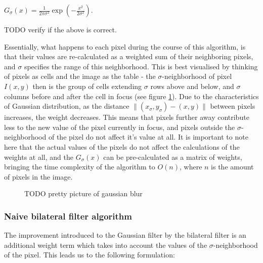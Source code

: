 \documentclass [12pt,a4paper]{report}
\begin{document}
\begin{center}
$G_\sigma(x) = \frac{1}{2\pi\sigma^2} \exp(-\frac{x^2}{2\sigma^2})$.
\end{center}

TODO verify if the above is correct.

Essentially, what happens to each pixel during the course of this algorithm, is that their values are re-calculated as a weighted sum of their neighboring pixels, and $\sigma$ specifies the range of this neighborhood. This is best visualised by thinking of pixels as cells and the image as the table - the $\sigma$-neighborhood of pixel $I(x,y)$ then is the group of cells extending $\sigma$ rows above and below, and $\sigma$ columns before and after the cell in focus (see figure \ref{fig_gaussian_blur}). Due to the characteristics of Gaussian distribution, as the distance $\| (x_\sigma, y_\sigma)-(x, y) \|$ between pixels increases, the weight decreases. This means that pixels further away contribute less to the new value of the pixel currently in focus, and pixels outside the $\sigma$-neighborhood of the pixel do not affect it's value at all. It is important to note here that the actual values of the pixels do not affect the calculations of the weights at all, and the $G_\sigma(x)$ can be pre-calculated as a matrix of weights, bringing the time complexity of the algorithm to $O(n)$, where $n$ is the amount of pixels in the image.

\begin{center}
\begin{figure}[h]
\caption{TODO pretty picture of gaussian blur}
\label{fig_gaussian_blur}
\end{figure}
\end{center}

\subsubsection{Naive bilateral filter algorithm}

The improvement introduced to the Gaussian filter by the bilateral filter is an additional weight term which takes into account the values of the $\sigma$-neighborhood of the pixel. This leads us to the following formulation:

\begin{center}
\begin{algorithm}[H]
\end{algorithm}
\end{center}
\end{document}
